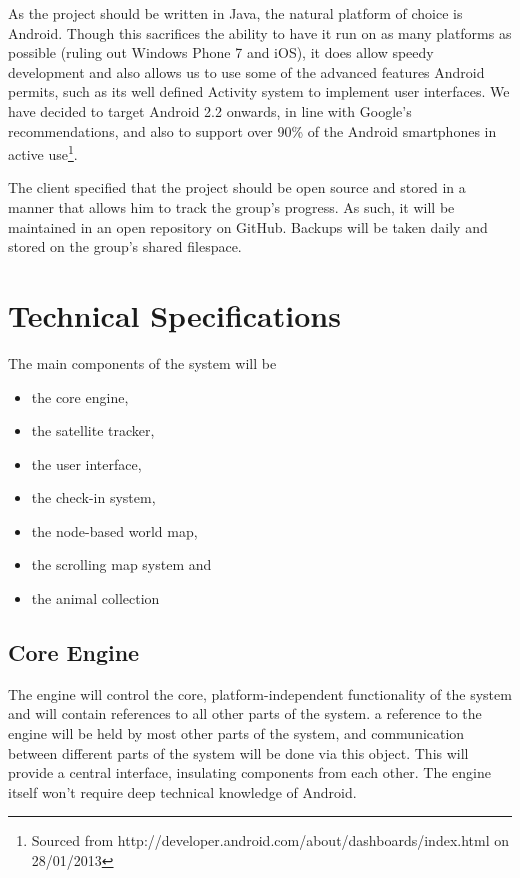 \documentclass[12pt,a4paper,twoside]{article}
\begin{document}
As the project should be written in Java, the natural platform of choice is Android.
Though this sacrifices the ability to have it run on as many platforms as possible (ruling out Windows Phone 7 and iOS), it does allow speedy development and also allows us to use some of the advanced features Android permits, such as its well defined Activity system to implement user interfaces.
We have decided to target Android 2.2 onwards, in line with Google's recommendations, and also to support over 90\% of the Android smartphones in active use\footnote{Sourced from http://developer.android.com/about/dashboards/index.html on 28/01/2013}.

The client specified that the project should be open source and stored in a manner that allows him to track the group's progress.
As such, it will be maintained in an open repository on GitHub.
Backups will be taken daily and stored on the group's shared filespace.

\section{Technical Specifications}
The main components of the system will be
\begin{itemize}
\item the core engine,
\item the satellite tracker,
\item the user interface,
\item the check-in system,
\item the node-based world map,
\item the scrolling map system and
\item the animal collection
\end{itemize}

\subsection{Core Engine}
The engine will control the core, platform-independent functionality of the system and will contain references to all other parts of the system.
a reference to the engine will be held by most other parts of the system, and communication between different parts of the system will be done via this object.
This will provide a central interface, insulating components from each other.
The engine itself won't require deep technical knowledge of Android.
\end{document}
